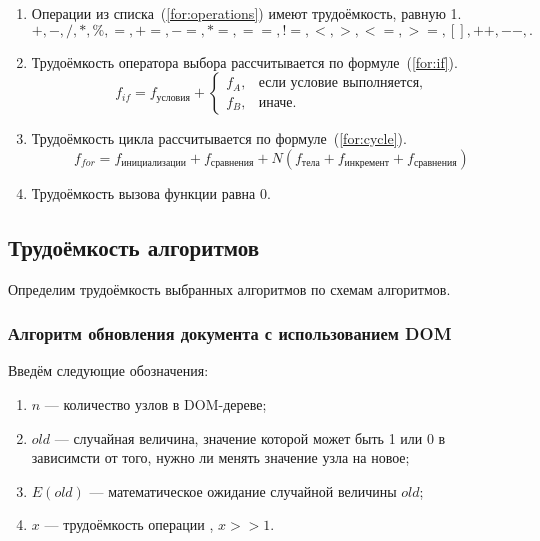 \begin{enumerate}[label=\arabic*)]
	\item Операции из списка~(\ref{for:operations}) имеют трудоёмкость, равную 1.
	\begin{equation}
		\label{for:operations}
		+, -, /, *, \%, =, +=, -=, *=, ==, !=, <, >, <=, >=, [], ++, {-}-, . 
	\end{equation}
	\item Трудоёмкость оператора выбора  рассчитывается по формуле~(\ref{for:if}).
	\begin{equation}
		\label{for:if}
		f_{if} = f_{\text{условия}} +
		\begin{cases}
			f_A, & \text{если условие выполняется,}\\
			f_B, & \text{иначе.}
		\end{cases}
	\end{equation}
	\item Трудоёмкость цикла рассчитывается по формуле~(\ref{for:cycle}).
	\begin{equation}
		\label{for:cycle}
		f_{for} = f_{\text{инициализации}} + f_{\text{сравнения}} + N(f_{\text{тела}} + f_{\text{инкремент}} + f_{\text{сравнения}})
	\end{equation}
	\item Трудоёмкость вызова функции равна 0.
\end{enumerate}


\subsection{Трудоёмкость алгоритмов}

Определим трудоёмкость выбранных алгоритмов по схемам алгоритмов.

\subsubsection{Алгоритм обновления документа с использованием DOM}

Введём следующие обозначения:
\begin{enumerate}[label=\arabic*)]
	\item $n$ --- количество узлов в DOM-дереве;
	\item $old$ --- случайная величина, значение которой может быть 1 или 0 в зависимсти от того, нужно ли менять значение узла на новое;
	\item $E(old)$ --- математическое ожидание случайной величины $old$;
	\item $x$ --- трудоёмкость операции , $x >> 1$.
\end{enumerate}

